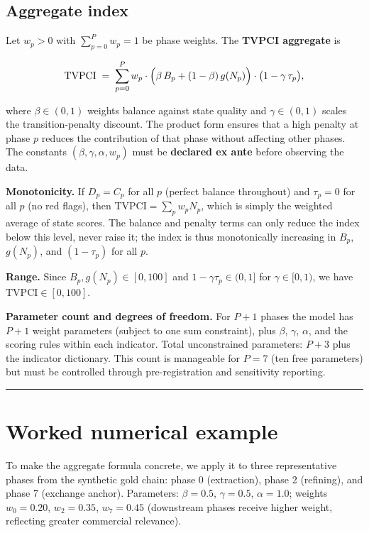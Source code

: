 \documentclass[12pt]{article}
\begin{document}
\subsection{Aggregate index}\label{aggregate-index}

Let \(w_p > 0\) with \(\sum_{p=0}^{P} w_p = 1\) be phase weights. The
\textbf{TVPCI aggregate} is

\[\mathrm{TVPCI} \;=\; \sum_{p=0}^{P} w_p \cdot \Bigl(\beta \, B_p + (1-\beta)\,g(N_p)\Bigr) \cdot \bigl(1 - \gamma \, \tau_p\bigr),\]

where \(\beta \in (0,1)\) weights balance against state quality and
\(\gamma \in (0,1)\) scales the transition-penalty discount. The product
form ensures that a high penalty at phase \(p\) reduces the contribution
of that phase without affecting other phases. The constants
\((\beta, \gamma, \alpha, w_p)\) must be \textbf{declared ex ante}
before observing the data.

\textbf{Monotonicity.} If \(D_p = C_p\) for all \(p\) (perfect balance
throughout) and \(\tau_p = 0\) for all \(p\) (no red flags), then
\(\mathrm{TVPCI} = \sum_p w_p N_p\), which is simply the weighted
average of state scores. The balance and penalty terms can only reduce
the index below this level, never raise it; the index is thus
monotonically increasing in \(B_p\), \(g(N_p)\), and \((1-\tau_p)\) for
all \(p\).

\textbf{Range.} Since \(B_p, g(N_p) \in [0,100]\) and
\(1 - \gamma \tau_p \in (0,1]\) for \(\gamma \in [0,1)\), we have
\(\mathrm{TVPCI} \in [0,100]\).

\textbf{Parameter count and degrees of freedom.} For \(P+1\) phases the
model has \(P+1\) weight parameters (subject to one sum constraint),
plus \(\beta\), \(\gamma\), \(\alpha\), and the scoring rules within
each indicator. Total unconstrained parameters: \(P + 3\) plus the
indicator dictionary. This count is manageable for \(P = 7\) (ten free
parameters) but must be controlled through pre-registration and
sensitivity reporting.

\begin{center}\rule{0.5\linewidth}{0.5pt}\end{center}

\section{Worked numerical example}\label{worked-numerical-example}

To make the aggregate formula concrete, we apply it to three
representative phases from the synthetic gold chain: phase 0
(extraction), phase 2 (refining), and phase 7 (exchange anchor).
Parameters: \(\beta = 0.5\), \(\gamma = 0.5\), \(\alpha = 1.0\); weights
\(w_0 = 0.20\), \(w_2 = 0.35\), \(w_7 = 0.45\) (downstream phases
receive higher weight, reflecting greater commercial relevance).
\end{document}
